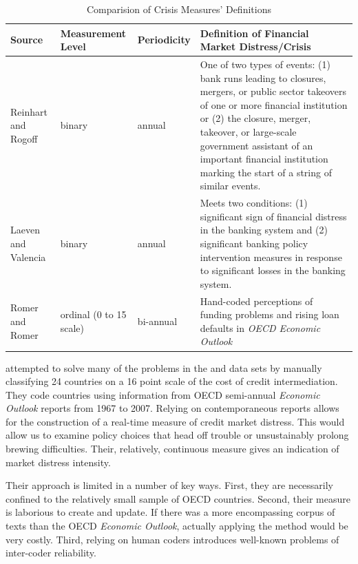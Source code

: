 \documentclass[]{article}
\begin{document}
\begin{table}
    \caption{Comparision of Crisis Measures' Definitions}
    \label{comp_table}
    \begin{center}
        \begin{tabular}{m{3cm} | m{2cm} m{2cm} m{7cm}}
            Source & Measurement Level & Periodicity &  Definition of Financial Market Distress/Crisis \\
            \hline\hline
                Reinhart and Rogoff \citeyearpar[11]{Reinhart2009,ReinhartRog2010} & binary & annual & One of two types of events: (1) bank runs leading to closures, mergers, or public sector takeovers of one or more financial institution or (2) the closure, merger, takeover, or large-scale government assistant of an important financial institution marking the start of a string of similar events.  \\
                Laeven and Valencia \citeyearpar[228]{laeven2013} & binary & annual & Meets two conditions: (1) significant sign of financial distress in the banking system and (2) significant banking policy intervention measures in response to significant losses in the banking system.  \\
                Romer and Romer \citeyearpar[3]{Romer2015} & ordinal (0 to 15 scale) & bi-annual & Hand-coded perceptions of funding problems and rising loan defaults in \emph{OECD Economic Outlook}  \\
            \hline
        \end{tabular}
    \end{center}
\end{table}

\cite{Romer2015} attempted to solve many of the problems in the \cite{Reinhart2009} and \cite{laeven2013} data sets by manually
classifying 24 countries on a 16 point scale of the cost of
credit intermediation. They code countries using information from OECD
semi-annual \emph{Economic Outlook} reports from 1967 to 2007. Relying
on contemporaneous reports allows for the construction of a real-time
measure of credit market distress. This would allow us to examine policy
choices that head off trouble or unsustainably prolong brewing
difficulties. Their, relatively, continuous measure gives an indication
of market distress intensity.

Their approach is limited in a number of key ways. First, they
are necessarily confined to the relatively small sample of OECD
countries. Second, their measure is laborious to create and update. If there was a more encompassing corpus of texts than the OECD \emph{Economic Outlook}, actually applying the method would be very costly. Third, relying on human coders introduces well-known problems of inter-coder reliability.
\end{document}
